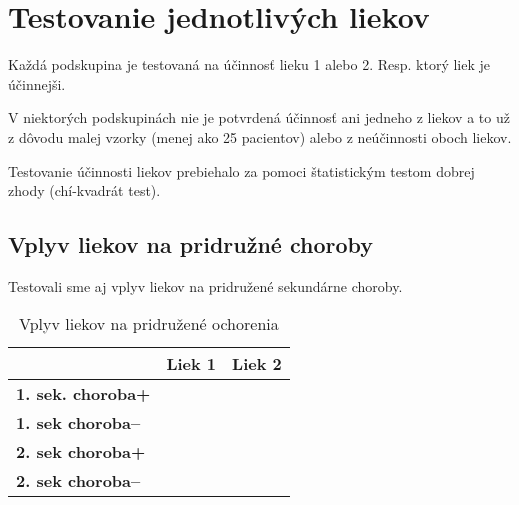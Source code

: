\section{Testovanie jednotlivých liekov}

Každá podskupina je testovaná na účinnosť lieku 1 alebo 2. Resp. ktorý liek je účinnejši.

V niektorých podskupinách nie je potvrdená účinnosť ani jedneho z liekov a to už z dôvodu malej vzorky (menej ako 25 pacientov) alebo z neúčinnosti oboch liekov.

Testovanie účinnosti liekov prebiehalo za pomoci štatistickým testom dobrej zhody (chí-kvadrát test).



\subsection{Vplyv liekov na pridružné choroby}

Testovali sme aj vplyv liekov na pridružené sekundárne choroby.

\begin{table}[h!]
\centering
\begin{tabular}{l|ll}
\hline
                          & \textbf{Liek 1} & \textbf{Liek 2} \\ \hline
\textbf{1. sek. choroba+} &                 &                 \\ \hline
\textbf{1. sek choroba--} &                 &                 \\ \hline
\textbf{2. sek choroba+}  &                 &                 \\ \hline
\textbf{2. sek choroba--} &                 &                 \\ \hline
\end{tabular}
\caption{Vplyv liekov na pridružené ochorenia}
\label{tab:sekundarne-ochorenia}
\end{table}
